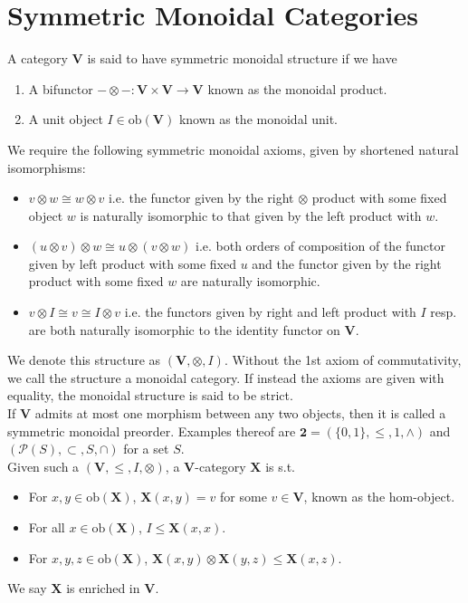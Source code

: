 \documentclass{article}
\newcommand{\cat}[1]{\mathbf{#1}}
\begin{document}
\section{Symmetric Monoidal Categories} \label{symmetric_monoidal_categories}
A category $\cat{V}$ is said to have symmetric monoidal structure if we have
\begin{enumerate}
	\item[(a)] A bifunctor $- \otimes -: \cat{V} \times \cat{V} \to \cat{V}$ known as the monoidal product.
	\item[(b)] A unit object $I \in \text{ob}(\cat{V})$ known as the monoidal unit.
\end{enumerate}
We require the following symmetric monoidal axioms, given by shortened natural isomorphisms:
\begin{itemize}
	\item $v \otimes w \cong w \otimes v$ i.e. the functor given by the right $\otimes$ product with some fixed object $w$ is naturally isomorphic to that given by the left product with $w$.
	\item $(u \otimes v) \otimes w \cong u \otimes (v \otimes w)$ i.e. both orders of composition of the functor given by left product with some fixed $u$ and the functor given by the right product with some fixed $w$ are naturally isomorphic.
	\item $v \otimes I \cong v \cong I \otimes v$ i.e. the functors given by right and left product with $I$ resp. are both naturally isomorphic to the identity functor on $\cat{V}$.
\end{itemize}
We denote this structure as $(\cat{V}, \otimes, I)$. Without the 1st axiom of commutativity, we call the structure a monoidal category. If instead the axioms are given with equality, the monoidal structure is said to be strict.\\
If $\cat{V}$ admits at most one morphism between any two objects, then it is called a symmetric monoidal preorder. Examples thereof are $\cat{2} = (\{0,1\},\leq, 1, \land)$ and $(\mathcal{P}(S), \subset, S, \cap)$ for a set $S$. \\
Given such a $(\cat{V}, \leq, I, \otimes)$, a $\cat{V}$-category $\cat{X}$ is s.t. 
\begin{itemize}
	\item For $x,y \in \text{ob}(\cat{X})$, $\cat{X}(x,y) = v$ for some $v \in \cat{V}$, known as the hom-object.
	\item For all $x \in \text{ob}(\cat{X})$, $I \leq \cat{X}(x, x)$.
	\item For $x,y,z \in \text{ob}(\cat{X})$, $\cat{X}(x,y) \otimes \cat{X}(y,z) \leq \cat{X}(x,z)$.
\end{itemize}
We say $\cat{X}$ is enriched in $\cat{V}$.
\end{document}
